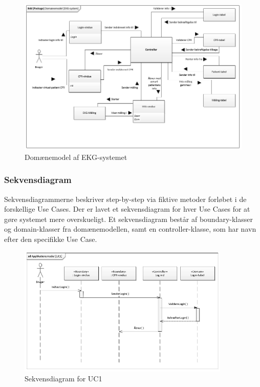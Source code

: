 \begin{figure}[H]
	\centering
	\includegraphics[width=1\textwidth]{Figurer/Snip20150429_37}
	\caption{Domænemodel af EKG-systemet}
\end{figure}

\subsubsection{Sekvensdiagram}
Sekvensdiagrammerne beskriver step-by-step via fiktive metoder forløbet i de forskellige Use Cases. Der er lavet et sekvensdiagram for hver Use Cases for at gøre systemet mere overskueligt. Et sekvensdiagram består af boundary-klasser og domain-klasser fra domænemodellen, samt en controller-klasse, som har navn efter den specifikke Use Case.  

\begin{figure}[H]
	\centering
	\includegraphics[width=0.9\textwidth]{Figurer/Snip20150429_34}
	\caption{Sekvensdiagram for UC1}
\end{figure}

